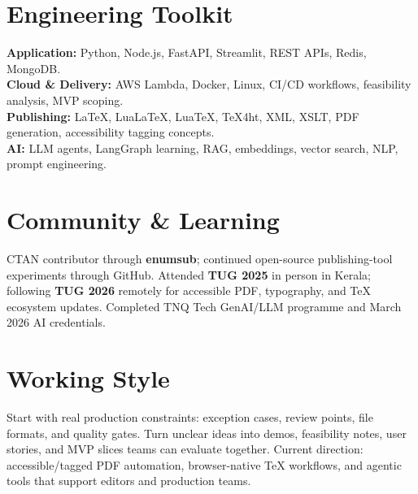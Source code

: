 \documentclass[10pt]{article}
\begin{document}
\section*{Engineering Toolkit}
\textbf{Application:} Python, Node.js, FastAPI, Streamlit, REST APIs, Redis, MongoDB.\\
\textbf{Cloud \& Delivery:} AWS Lambda, Docker, Linux, CI/CD workflows, feasibility analysis, MVP scoping.\\
\textbf{Publishing:} LaTeX, LuaLaTeX, LuaTeX, TeX4ht, XML, XSLT, PDF generation, accessibility tagging concepts.\\
\textbf{AI:} LLM agents, LangGraph learning, RAG, embeddings, vector search, NLP, prompt engineering.

\section*{Community \& Learning}
CTAN contributor through \textbf{enumsub}; continued open-source publishing-tool experiments through GitHub. Attended \textbf{TUG 2025} in person in Kerala; following \textbf{TUG 2026} remotely for accessible PDF, typography, and TeX ecosystem updates. Completed TNQ Tech GenAI/LLM programme and March 2026 AI credentials.

\section*{Working Style}
Start with real production constraints: exception cases, review points, file formats, and quality gates. Turn unclear ideas into demos, feasibility notes, user stories, and MVP slices teams can evaluate together. Current direction: accessible/tagged PDF automation, browser-native TeX workflows, and agentic tools that support editors and production teams.
\end{document}
